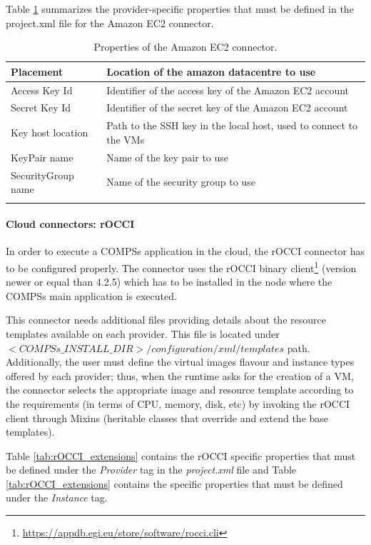 Table \ref{tab:ec2_connector_properties} summarizes the provider-specific properties that must be 
defined in the project.xml file for the Amazon EC2 connector.
\bgroup
  \def\arraystretch{1.5}
  \begin{longtable}{| p{} | p{} |}
  \hline
  \textbf{Placement}  &   Location of the amazon datacentre to use \\ \hline
  Access Key Id       &   Identifier of the access key of the Amazon EC2 account \\ \hline
  Secret Key Id       &   Identifier of the secret key of the Amazon EC2 account \\ \hline
  Key host location   &   Path to the SSH key in the local host, used to connect to the VMs \\ \hline
  KeyPair name        &   Name of the key pair to use \\ \hline
  SecurityGroup name  &   Name of the security group to use \\ \hline
  
  \caption{Properties of the Amazon EC2 connector.}
  \label{tab:ec2_connector_properties}
  \end{longtable}
\egroup

\paragraph{Cloud connectors: rOCCI}
In order to execute a COMPSs application in the cloud, the rOCCI connector has to be configured properly. 
The connector uses the rOCCI binary client\footnote{\url{https://appdb.egi.eu/store/software/rocci.cli}} 
(version newer or equal than 4.2.5) which has to be installed in the node where the COMPSs main 
application is executed.

This connector needs additional files providing details about the resource templates available on 
each provider. This file is located under $<COMPSs\_INSTALL\_DIR>/configuration/xml/templates$ path.
Additionally, the user must define the virtual images flavour and instance types offered by each provider; 
thus, when the runtime asks for the creation of a VM, the connector selects the appropriate image and 
resource template according to the requirements (in terms of CPU, memory, disk, etc) by invoking the 
rOCCI client through Mixins (heritable classes that override and extend the base templates).

Table \ref{tab:rOCCI_extensions} contains the rOCCI specific properties that must be defined under the \textit{Provider} tag in
the \textit{project.xml} file and Table \ref{tab:rOCCI_extensions} contains the specific properties that must be defined
under the \textit{Instance} tag.

